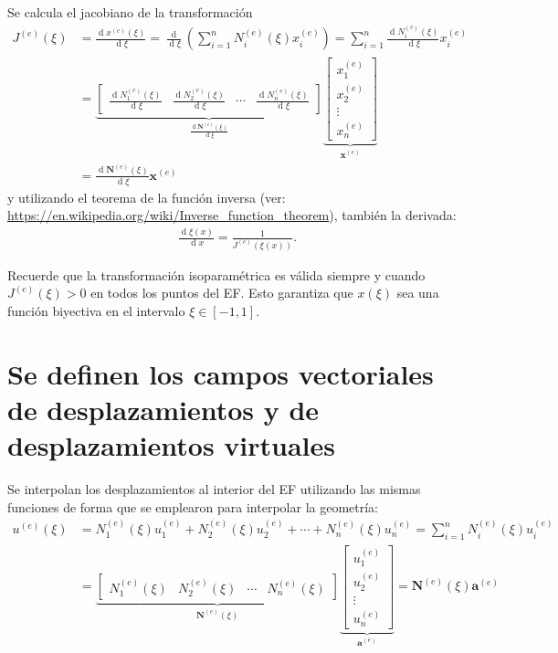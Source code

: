 \documentclass[12pt,letterpaper]{article}
\newcommand{\ve}[1]{{\boldsymbol{#1}}}
\newcommand{\ma}[1]{{\boldsymbol{#1}}}
\newcommand{\dd}{\operatorname{d} \!}
\begin{document}
Se calcula el jacobiano de la transformación
\begin{align}
J^{(e)}(\xi) &= \frac{\dd x^{(e)}(\xi)}{\dd \xi} = 
\frac{\dd}{\dd \xi}\left(\sum_{i=1}^n N_i^{(e)}(\xi) x_i^{(e)}\right) = \sum_{i=1}^n \frac{\dd N_i^{(e)}(\xi)}{\dd \xi} x_i^{(e)} \\
&= 
\underbrace{\begin{bmatrix}
    \frac{\dd N_1^{(e)}(\xi)}{\dd \xi} & \frac{\dd N_2^{(e)}(\xi)}{\dd \xi} & \cdots & \frac{\dd N_n^{(e)}(\xi)}{\dd \xi}
    \end{bmatrix}}_{\frac{\dd \ma{N}^{(e)}(\xi)}{\dd \xi}}
\underbrace{\begin{bmatrix}
    x_1^{(e)} \\ x_2^{(e)} \\ \vdots \\ x_n^{(e)}
    \end{bmatrix}}_{\ma{x}^{(e)}} \\
&= \frac{\dd \ma{N}^{(e)}(\xi)}{\dd \xi}  \ve{x}^{(e)}
\end{align}
y utilizando el teorema de la función inversa (ver: \url{https://en.wikipedia.org/wiki/Inverse_function_theorem}), también la derivada:
\begin{align}
\frac{\dd \xi(x)}{\dd x} = \frac{1}{J^{(e)}(\xi(x))}.
\end{align}


Recuerde que la transformación isoparamétrica es válida siempre y cuando $J^{(e)}(\xi)>0$ en todos los puntos del EF. Esto garantiza que $x(\xi)$ sea una función biyectiva en el intervalo $\xi\in[-1,1]$.



\newpage

\section{Se definen los campos vectoriales de desplazamientos y  de desplazamientos virtuales}
Se interpolan los desplazamientos al interior del EF utilizando las mismas funciones de forma que se emplearon para interpolar la geometría:
\begin{align}
u^{(e)}(\xi) 
&= N_1^{(e)}(\xi) u_1^{(e)} + N_2^{(e)}(\xi) u_2^{(e)} + \cdots + N_n^{(e)}(\xi) u_n^{(e)} 
= \sum_{i=1}^n N_i^{(e)}(\xi) u_i^{(e)} \\
&= 
\underbrace{\begin{bmatrix}
N_1^{(e)}(\xi) & N_2^{(e)}(\xi) & \cdots & N_n^{(e)}(\xi)
\end{bmatrix}}_{\ma{N}^{(e)}(\xi)}
\underbrace{\begin{bmatrix}
   u_1^{(e)} \\ u_2^{(e)} \\ \vdots \\ u_n^{(e)}
   \end{bmatrix}}_{\ma{a}^{(e)}} = \ma{N}^{(e)}(\xi)  \ve{a}^{(e)}
\end{align}
\end{document}
